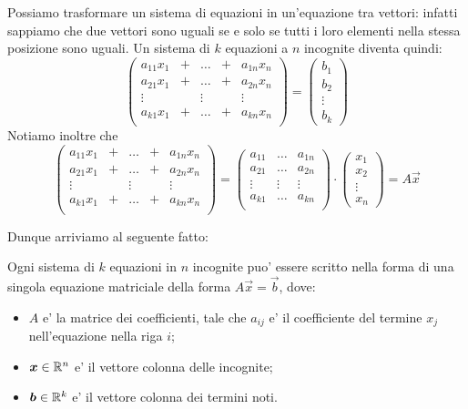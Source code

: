Possiamo trasformare un sistema di equazioni in un'equazione tra vettori: infatti sappiamo che due vettori sono uguali se e solo se tutti i loro elementi nella stessa posizione sono uguali. Un sistema di $k$ equazioni a $n$ incognite diventa quindi:
\begin{equation*}
    \begin{pmatrix}
        a_{11}x_1 & + & \dots & + & a_{1n}x_n \\
        a_{21}x_1 & + & \dots & + & a_{2n}x_n \\
        \vdots    &   & \vdots &  & \vdots\\
        a_{k1}x_1 & + & \dots & + & a_{kn}x_n \\
    \end{pmatrix} = \begin{pmatrix}
        b_1 \\ b_2 \\ \vdots \\ b_k
    \end{pmatrix}
\end{equation*}
Notiamo inoltre che 
\begin{equation*}
    \begin{pmatrix}
        a_{11}x_1 & + & \dots & + & a_{1n}x_n \\
        a_{21}x_1 & + & \dots & + & a_{2n}x_n \\
        \vdots    &   & \vdots &  & \vdots\\
        a_{k1}x_1 & + & \dots & + & a_{kn}x_n \\
    \end{pmatrix} = \begin{pmatrix}
        a_{11} & \dots & a_{1n} \\
        a_{21} & \dots & a_{2n} \\
        \vdots & \vdots& \vdots \\
        a_{k1} & \dots & a_{kn} \\
    \end{pmatrix} \cdot \begin{pmatrix} x_1 \\ x_2 \\ \vdots \\ x_n \end{pmatrix}
    = A\vec{x}
\end{equation*}

Dunque arriviamo al seguente fatto:
\begin{proposition}
    Ogni sistema di $k$ equazioni in $n$ incognite puo' essere scritto nella forma di una singola equazione matriciale della forma $A\vec{x} = \vec{b}$, dove:
    \begin{itemize}
        \item $A$ e' la matrice dei coefficienti, tale che $a_{ij}$ e' il coefficiente del termine $x_j$ nell'equazione nella riga $i$;
        \item $\bm{x} \in \mathbb{R}^n$ e' il vettore colonna delle incognite;
        \item $\bm{b} \in \mathbb{R}^k$ e' il vettore colonna dei termini noti.
    \end{itemize}
\end{proposition}
    
